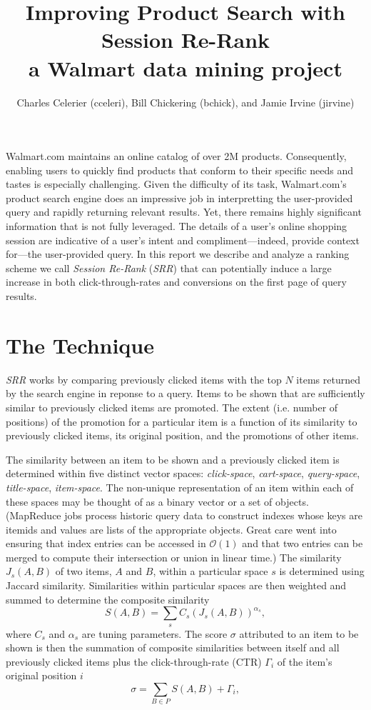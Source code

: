 \documentclass{article}
\title{Improving Product Search with Session Re-Rank\\
    \large{a Walmart data mining project}}
\author{Charles Celerier (cceleri), Bill Chickering (bchick),
        and Jamie Irvine (jirvine)}
\begin{document}
\maketitle

Walmart.com maintains an online catalog of over 2M products. Consequently,
enabling users to quickly find products that conform to their specific needs and
tastes is especially challenging. Given the difficulty of its task,
Walmart.com's product search engine does an impressive job in interpretting the
user-provided query and rapidly returning relevant results. Yet, there remains
highly significant information that is not fully leveraged. The details of a user's online shopping session are indicative of a user's intent and
compliment---indeed, provide context for---the user-provided query. In this report
we describe and analyze a ranking scheme we call {\em Session Re-Rank} ({\em SRR}) that can
potentially induce a large increase in both click-through-rates and conversions
on the first page of query results.

\section{The Technique}

{\em SRR} works by comparing previously clicked items with the top
$N$ items returned by the search engine in reponse to a query. Items to be shown
that are sufficiently similar to previously clicked items are promoted. The
extent (i.e. number of positions) of the promotion for a particular item is a
function of its similarity to previously clicked items, its original position,
and the promotions of other items.

The similarity between an item to be shown and a previously clicked item is
determined within five distinct vector spaces: {\em click-space}, {\em
cart-space}, {\em query-space}, {\em title-space}, {\em item-space}. The
non-unique representation of an item within each of these spaces may be thought
of as a binary vector or a set of objects. (MapReduce jobs process historic
query data to construct indexes whose keys are itemids and values are lists of
the appropriate objects. Great care went into ensuring that index entries can be
accessed in $\mathcal{O}(1)$ and that two entries can be merged to compute their
intersection or union in linear time.) The similarity $J_s(A, B)$ of two items,
$A$ and $B$, within a particular space $s$ is determined using Jaccard
similarity. Similarities within particular spaces are then weighted and summed
to determine the composite similarity
\begin{equation}\label{eqn:similarity_metric}
    S(A, B) = \sum_s{C_s(J_s(A, B))^{\alpha_s}},
\end{equation}
where $C_s$ and $\alpha_s$ are tuning parameters. The score $\sigma$ attributed
to an item to be shown is then the summation of composite similarities between
itself and all previously clicked items plus the click-through-rate (CTR)
$\Gamma_i$ of the item's original position $i$
\begin{equation*}
    \sigma = \sum_{B \in P}{S(A, B)} + \Gamma_i,
\end{equation*}
\end{document}
